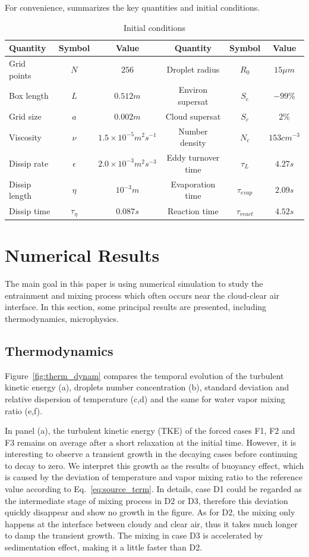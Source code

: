 \documentclass[draft,jgrga]{AGUTeX}
\newcommand{\Eq}[1]{Eq.~\eqref{#1}} \newcommand{\Fig}[1]{Figure~\ref{#1}}
\begin{document}
\begin{article}
For convenience,  summarizes the key quantities and initial conditions.
\begin{table}[T]
\begin{tabular}{l c c c c c}
\hline\hline
Quantity & Symbol & Value & Quantity & Symbol & Value\\
\hline
Grid points & $N$ & $256$ & Droplet radius & $R_{0}$ & $15\mu m$\\
Box length & $L$ & $0.512m$ & Environ supersat & $S_{e}$ & $-99\%$\\
Grid size & $a$ & $0.002m$ & Cloud supersat & $S_{c}$ & $2\%$\\
Viscosity & $\nu$ & $1.5\times10^{-5}m^{2}s^{-1}$ & Number density& $N_{c}$ & $153cm^{-3}$\\
Dissip rate& $\epsilon$ & $2.0\times10^{-3}m^{2}s^{-3}$ & Eddy turnover time & $\tau_{L}$ & $4.27s$\\
Dissip length& $\eta$ & $10^{-3}m$ & Evaporation time & $\tau_{evap}$ & $2.09s$\\
Dissip time& $\tau_{\eta}$ & $0.087s$ & Reaction time & $\tau_{react}$ & $4.52s$\\
\hline
\end{tabular}
\caption{Initial conditions}
\label{tb:parameters}
\end{table}

\section{Numerical Results}\label{numerical_results}
The main goal in this paper is using numerical simulation to study
the entrainment and mixing process which often occurs near the cloud-clear air interface. In this section, some principal results are presented, including thermodynamics, microphysics.

\subsection{Thermodynamics}
\Fig{fig:therm_dynam} compares the temporal evolution of the turbulent kinetic energy (a), droplets number concentration (b), standard deviation and relative dispersion of temperature (c,d) and the same for water vapor mixing ratio (e,f). 

In panel (a), the turbulent kinetic energy (TKE) of the forced cases F1, F2 and F3 remains on average after a short relaxation at the initial time. However, it is interesting to observe a transient growth in the decaying cases before continuing to decay to zero. We interpret this growth as the results of buoyancy effect, which is caused by the deviation of temperature and vapor mixing ratio to the reference value according to \Eq{eq:source_term}. In details, case D1 could be regarded as the intermediate stage of mixing process in D2 or D3, therefore this deviation quickly disappear and show no growth in the figure. As for D2, the mixing only happens at the interface between cloudy and clear air, thus it takes much longer to damp the transient growth. The mixing in case D3 is accelerated by sedimentation effect, making it a little faster than D2.


\end{article}
\end{document}
